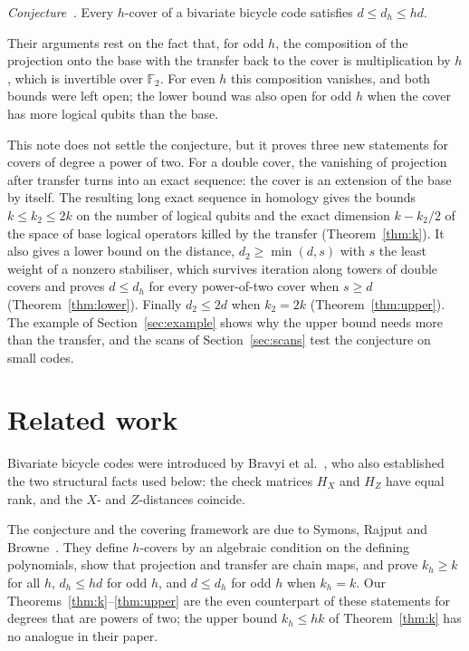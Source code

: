 \documentclass[11pt,a4paper]{article}
\theoremstyle{definition}
\theoremstyle{plain}
\newcommand{\F}{\mathbb{F}_2}
\begin{document}
\emph{Conjecture~\cite{Symons2025}.} Every $h$-cover of a bivariate bicycle
code satisfies $d\le d_h\le hd$.

Their arguments rest on the fact that, for odd $h$, the composition of the
projection onto the base with the transfer back to the cover is multiplication
by $h$, which is invertible over $\F$. For even $h$ this composition vanishes,
and both bounds were left open; the lower bound was also open for odd $h$ when
the cover has more logical qubits than the base.

This note does not settle the conjecture, but it proves three new statements
for covers of degree a power of two. For a double cover, the vanishing of
projection after transfer turns into an exact sequence: the cover is an
extension of the base by itself. The resulting long exact sequence in
homology gives the bounds $k\le k_2\le2k$ on the number of logical qubits and
the exact dimension $k-k_2/2$ of the space of base logical operators killed
by the transfer (Theorem~\ref{thm:k}). It also gives a lower bound on the
distance, $d_2\ge\min(d,s)$ with $s$ the least weight of a nonzero
stabiliser, which survives iteration along towers of double covers and proves
$d\le d_h$ for every power-of-two cover when $s\ge d$
(Theorem~\ref{thm:lower}). Finally $d_2\le2d$ when $k_2=2k$
(Theorem~\ref{thm:upper}). The example of Section~\ref{sec:example} shows why
the upper bound needs more than the transfer, and the scans of
Section~\ref{sec:scans} test the conjecture on small codes.

\section{Related work}\label{sec:related}
Bivariate bicycle codes were introduced by Bravyi et al.~\cite{Bravyi2024},
who also established the two structural facts used below: the check matrices
$H_X$ and $H_Z$ have equal rank, and the $X$- and $Z$-distances coincide.

The conjecture and the covering framework are due to Symons, Rajput and
Browne~\cite{Symons2025}. They define $h$-covers by an algebraic condition on
the defining polynomials, show that projection and transfer are chain maps,
and prove $k_h\ge k$ for all $h$, $d_h\le hd$ for odd $h$, and $d\le d_h$ for
odd $h$ when $k_h=k$. Our Theorems~\ref{thm:k}--\ref{thm:upper} are the even
counterpart of these statements for degrees that are powers of two; the upper
bound $k_h\le hk$ of Theorem~\ref{thm:k} has no analogue in their paper.
\end{document}
